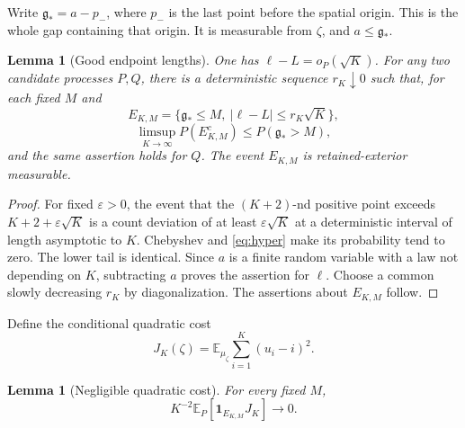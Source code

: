 \documentclass[11pt,reqno]{amsart}
\numberwithin{equation}{section}
\newtheorem{lemma}[theorem]{Lemma}
\theoremstyle{definition}
\theoremstyle{remark}
\newcommand{\E}{\mathbb E}
\newcommand{\1}{\mathbf 1}
\newcommand{\gap}{\mathfrak g}
\begin{document}
Write $\gap_*=a-p_-$, where $p_-$ is the last point before the spatial
origin. This is the whole gap containing that origin. It is measurable
from $\zeta$, and $a\le\gap_*$.

\begin{lemma}[Good endpoint lengths]\label{lem:length}
One has $\ell-L=o_P(\sqrt K)$. For any two candidate processes $P,Q$,
there is a deterministic sequence $r_K\downarrow0$ such that, for each
fixed $M$ and
\begin{equation}\label{eq:good}
E_{K,M}=\{\gap_*\le M,\ |\ell-L|\le r_K\sqrt K\},
\end{equation}
\[
\limsup_{K\to\infty}P(E_{K,M}^c)\le P(\gap_*>M),
\]
and the same assertion holds for $Q$.
The event $E_{K,M}$ is retained-exterior measurable.
\end{lemma}

\begin{proof}
For fixed $\varepsilon>0$, the event that the $(K+2)$-nd positive point
exceeds $K+2+\varepsilon\sqrt K$ is a count deviation of at least
$\varepsilon\sqrt K$ at a deterministic interval of length asymptotic
to $K$. Chebyshev and \eqref{eq:hyper} make its probability tend to
zero. The lower tail is identical. Since $a$ is a finite random variable
with a law not depending on $K$, subtracting $a$ proves the assertion
for $\ell$. Choose a common slowly decreasing $r_K$ by diagonalization.
The assertions about $E_{K,M}$ follow.
\end{proof}

Define the conditional quadratic cost
\begin{equation}\label{eq:J}
J_K(\zeta)=\E_{\mu_\zeta}\sum_{i=1}^K(u_i-i)^2.
\end{equation}

\begin{lemma}[Negligible quadratic cost]\label{lem:quadratic}
For every fixed $M$,
\begin{equation}\label{eq:J-small}
K^{-2}\E_P[\1_{E_{K,M}}J_K]\longrightarrow0.
\end{equation}
\end{lemma}
\end{document}
